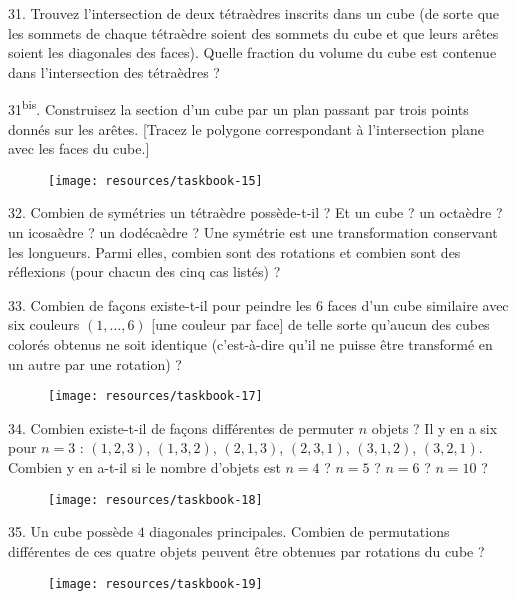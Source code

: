 \begin{problem}{31.}
	Trouvez l'intersection de deux tétraèdres inscrits dans un cube (de sorte
	que les sommets de chaque tétraèdre soient des sommets du cube et que leurs
	arêtes soient les diagonales des faces).
	Quelle fraction du volume du cube est contenue dans l'intersection des
	tétraèdres ?
\end{problem}

\begin{problem}{31\textsuperscript{bis}.} Construisez la section d'un cube par
	un plan passant par trois points donnés sur les arêtes.
	[Tracez le polygone correspondant à l'intersection plane avec les faces du
	cube.]
	\begin{figure}
		\texttt{[image: resources/taskbook-15]}
	\end{figure}
\end{problem}

\begin{problem}{32.}
	Combien de symétries un tétraèdre possède-t-il ? Et un cube ? un octaèdre ?
	un icosaèdre ? un dodécaèdre ? Une symétrie est une transformation
	conservant les longueurs.
	Parmi elles, combien sont des rotations et combien sont des réflexions (pour
	chacun des cinq cas listés) ?
\end{problem}

\begin{problem}{33.}
	Combien de façons existe-t-il pour peindre les $6$ faces d'un cube similaire
	avec six couleurs $(1,\dotsc,6)$ [une couleur par face] de telle sorte
	qu'aucun des cubes colorés obtenus ne soit identique (c'est-à-dire qu'il ne
	puisse être transformé en un autre par une rotation) ?
	\begin{figure}
		\texttt{[image: resources/taskbook-17]}
	\end{figure}
\end{problem}

\begin{problem}{34.}
	Combien existe-t-il de façons différentes de permuter $n$ objets ? Il y en a
	six pour $n=3$ : $(1,2,3)$, $(1,3,2)$, $(2,1,3)$, $(2,3,1)$, $(3,1,2)$,
	$(3,2,1)$. Combien y en a-t-il si le nombre d'objets est $n=4$ ? $n=5$ ?
	$n=6$ ? $n=10$ ?  
	\begin{figure}
		\texttt{[image: resources/taskbook-18]}
	\end{figure}
\end{problem}

\begin{problem}{35.}
	Un cube possède $4$ diagonales principales. Combien de permutations
	différentes de ces quatre objets peuvent être obtenues par rotations du cube
	?
	\begin{figure}
		\texttt{[image: resources/taskbook-19]}
	\end{figure}
\end{problem}

